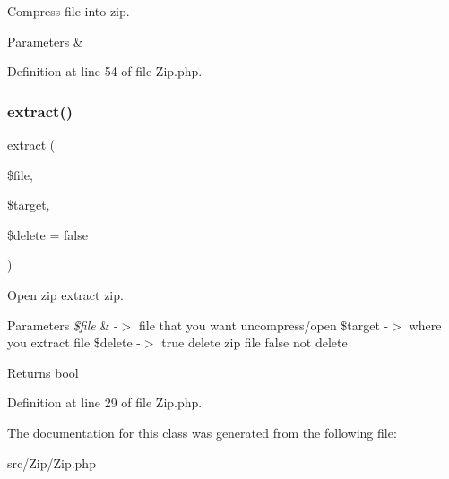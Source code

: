 Compress file into zip.


\begin{DoxyParams}{Parameters}
{\em } & \\
\hline
\end{DoxyParams}


Definition at line 54 of file Zip.\+php.

\mbox{\label{class_zest_1_1_zip_1_1_zip_a84d25d2e4048fa91d6c90f7ae44bd302}} 
\subsubsection{\texorpdfstring{extract()}{extract()}}
{\footnotesize\ttfamily extract (\begin{DoxyParamCaption}\item[{}]{\$file,  }\item[{}]{\$target,  }\item[{}]{\$delete = {\ttfamily false} }\end{DoxyParamCaption})}

Open zip extract zip.


\begin{DoxyParams}{Parameters}
{\em \$file} & -\/$>$ file that you want uncompress/open \$target -\/$>$ where you extract file \$delete -\/$>$ true delete zip file false not delete\\
\hline
\end{DoxyParams}
\begin{DoxyReturn}{Returns}
bool 
\end{DoxyReturn}


Definition at line 29 of file Zip.\+php.



The documentation for this class was generated from the following file\+:\begin{DoxyCompactItemize}
\item 
src/\+Zip/Zip.\+php\end{DoxyCompactItemize}
